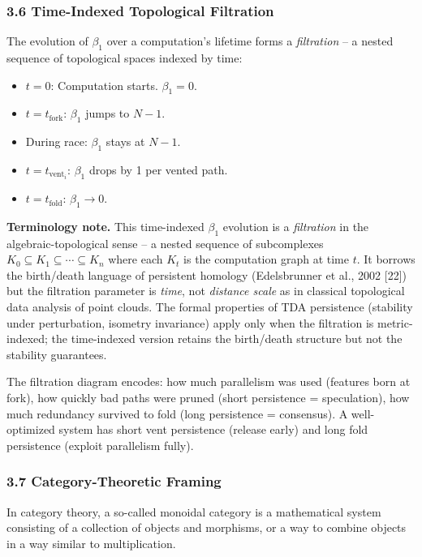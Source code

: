 \documentclass[
  11pt,
]{article}
\begin{document}
\subsubsection{3.6 Time-Indexed Topological
Filtration}\label{time-indexed-topological-filtration}

The evolution of \(\beta_1\) over a computation's lifetime forms a
\emph{filtration} -- a nested sequence of topological spaces indexed by
time:

\begin{itemize}
\item
  \(t = 0\): Computation starts. \(\beta_1 = 0\).
\item
  \(t = t_{\text{fork}}\): \(\beta_1\) jumps to \(N-1\).
\item
  During race: \(\beta_1\) stays at \(N-1\).
\item
  \(t = t_{\text{vent}_i}\): \(\beta_1\) drops by 1 per vented path.
\item
  \(t = t_{\text{fold}}\): \(\beta_1 \to 0\).
\end{itemize}

\textbf{Terminology note.} This time-indexed \(\beta_1\) evolution is a
\emph{filtration} in the algebraic-topological sense -- a nested
sequence of subcomplexes
\(K_0 \subseteq K_1 \subseteq \cdots \subseteq K_n\) where each \(K_t\)
is the computation graph at time \(t\). It borrows the birth/death
language of persistent homology (Edelsbrunner et al., 2002 {[}22{]}) but
the filtration parameter is \emph{time}, not \emph{distance scale} as in
classical topological data analysis of point clouds. The formal
properties of TDA persistence (stability under perturbation, isometry
invariance) apply only when the filtration is metric-indexed; the
time-indexed version retains the birth/death structure but not the
stability guarantees.

The filtration diagram encodes: how much parallelism was used (features
born at fork), how quickly bad paths were pruned (short persistence =
speculation), how much redundancy survived to fold (long persistence =
consensus). A well-optimized system has short vent persistence (release
early) and long fold persistence (exploit parallelism fully).

\subsubsection{3.7 Category-Theoretic
Framing}\label{category-theoretic-framing}

In category theory, a so-called monoidal category is a mathematical
system consisting of a collection of objects and morphisms, or a way to
combine objects in a way similar to multiplication.
\end{document}
